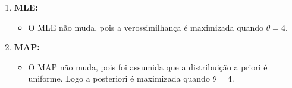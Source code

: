\documentclass[12 pt]{article}
\begin{document}
\begin{enumerate}
\begin{tcolorbox}[colback=white, colframe=black, title=Resposta:]
\begin{enumerate}
\begin{itemize}
            \end{itemize}
            \item \textbf{MLE:}
            \begin{itemize}
                \item O MLE não muda, pois a verossimilhança é maximizada quando \( \theta = 4 \).
            \end{itemize}
            \item \textbf{MAP:}
            \begin{itemize}
                \item O MAP não muda, pois foi assumida que a distribuição a priori é uniforme. Logo a posteriori é maximizada quando \( \theta = 4 \).
            \end{itemize}
        \end{enumerate}
    \end{tcolorbox}
\end{enumerate}
\end{document}
